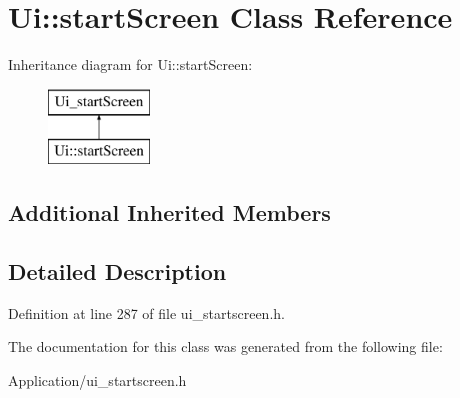 \hypertarget{class_ui_1_1start_screen}{}\section{Ui\+:\+:start\+Screen Class Reference}
\label{class_ui_1_1start_screen}
Inheritance diagram for Ui\+:\+:start\+Screen\+:\begin{figure}[H]
\begin{center}
\leavevmode
\includegraphics[height=2.000000cm]{class_ui_1_1start_screen}
\end{center}
\end{figure}
\subsection*{Additional Inherited Members}


\subsection{Detailed Description}


Definition at line 287 of file ui\+\_\+startscreen.\+h.



The documentation for this class was generated from the following file\+:\begin{DoxyCompactItemize}
\item 
Application/ui\+\_\+startscreen.\+h\end{DoxyCompactItemize}
